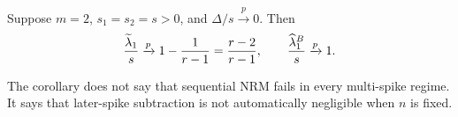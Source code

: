 \begin{corollary}\label{cor:twospike}
Suppose $m=2$, $s_1=s_2=s>0$, and $\Delta/s\xrightarrow{p}0$.  Then
\begin{equation}
\frac{\widetilde{\lambda}_1}{s}\xrightarrow{p}1-\frac1{r-1}=\frac{r-2}{r-1},
\qquad
\frac{\widehat{\lambda}_1^B}{s}\xrightarrow{p}1.
\end{equation}
\end{corollary}
The corollary does not say that sequential NRM fails in every multi-spike regime.  It says that later-spike subtraction is not automatically negligible when $n$ is fixed.
